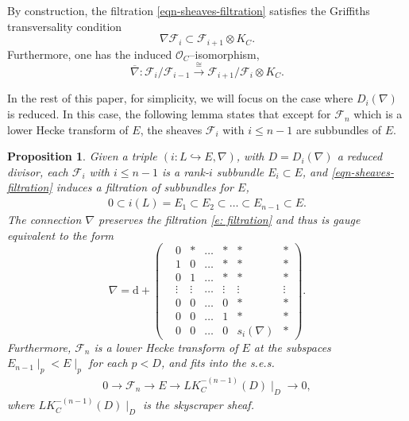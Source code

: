 \documentclass[twoside, 11pt]{article}
\numberwithin{equation}{section}
\theoremstyle{theorem}
\numberwithin{theorem}{section}
\newtheorem{proposition}[proposition]{Proposition}
\theoremstyle{definition}
\begin{document}
By construction, the filtration \eqref{eqn-sheaves-filtration}
satisfies the Griffiths transversality condition
\[
\nabla \mathcal{F}_i \subset \mathcal{F}_{i+1} \otimes K_C.
\]
Furthermore, one has the induced $\mathcal{O}_{C}$--isomorphism,
\begin{equation}\label{eqn-induced-graded-morphism}
\overline \nabla: \mathcal{F}_i / \mathcal{F}_{i-1} \overset{\cong }\longrightarrow \mathcal{F}_{i+1} / \mathcal{F}_i \otimes K_C.   
\end{equation}


\medskip
In the rest of this paper, for simplicity, we will focus on the case where 
$D_i(\nabla)$ is reduced.
In this case, the following lemma states that  
except for $\mathcal{F}_n$ which is a lower Hecke transform of $E$,
the sheaves $\mathcal{F}_i$ with $i \leq n-1$ are subbundles of $E$.

\begin{proposition}\label{l:lower hecke}
Given a triple $(i: L \hookrightarrow E, \nabla)$,
with \(D = D_i(\nabla)\) a reduced divisor, each \(\mathcal{F}_i\) with \(i \leq n-1\) is a rank-\(i\) subbundle \(E_i \subset E\), 
and \eqref{eqn-sheaves-filtration} 
induces a filtration of subbundles for $E$, 
\begin{align}\label{e: filtration}
0 \subset i(L) = E_1 \subset E_2 \subset \dots \subset E_{n-1} \subset E. 
\end{align}
The connection $\nabla$ preserves the filtration \eqref{e: filtration} and thus is gauge equivalent to the form
\begin{equation}\label{eqn-nabla-filtration}
    \nabla = \mathrm{d} +
    \begin{pmatrix}
        &0  &\ast &\dots &\ast &\ast &\ast  \\
        &1 &0 &\dots &\ast &\ast &\ast \\
        &0 &1 &\dots &\ast &\ast &\ast \\
        &\vdots  &\vdots &\dots &\vdots  &\vdots &\vdots \\
        &0  &0 &\dots &0 &\ast &\ast \\
        &0  &0 &\dots &1 &\ast &\ast \\
        &0  &0 &\dots &0 &s_i(\nabla) &\ast 
    \end{pmatrix}.
\end{equation}
Furthermore, $\mathcal{F}_n$ is a lower Hecke transform of \(E\)  
at the subspaces $E_{n-1}\mid_p < E\mid_p$ for each \(p < D\), 
and fits into the s.e.s.
\begin{align}\label{eqn-Fn-E}
    0 \longrightarrow \mathcal{F}_n \longrightarrow E \longrightarrow L K_C^{-(n-1)}(D)\mid_D \longrightarrow  0,
\end{align}
where $L K_C^{-(n-1)}(D)\mid_D$ is the skyscraper sheaf.
\end{proposition}
\end{document}
